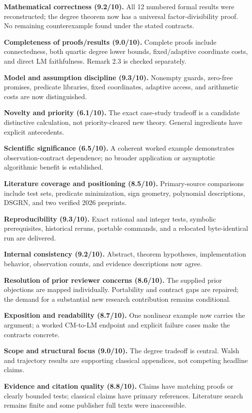 \documentclass[
  11pt,
]{article}
\begin{document}
\textbf{Mathematical correctness (9.2/10).} All 12 numbered formal
results were reconstructed; the degree theorem now has a universal
factor-divisibility proof. No remaining counterexample found under the
stated contracts.

\textbf{Completeness of proofs/results (9.0/10).} Complete proofs
include connectedness, both quartic degree lower bounds, fixed/adaptive
coordinate costs, and direct LM faithfulness. Remark 2.3 is checked
separately.

\textbf{Model and assumption discipline (9.3/10).} Nonempty guards,
zero-free promises, predicate libraries, fixed coordinates, adaptive
access, and arithmetic costs are now distinguished.

\textbf{Novelty and priority (6.1/10).} The exact case-study tradeoff is
a candidate distinctive calculation, not priority-cleared new theory.
General ingredients have explicit antecedents.

\textbf{Scientific significance (6.5/10).} A coherent worked example
demonstrates observation-contract dependence; no broader application or
asymptotic algorithmic benefit is established.

\textbf{Literature coverage and positioning (8.5/10).} Primary-source
comparisons include test sets, predicate minimization, sign geometry,
polynomial descriptions, DSGRN, and two verified 2026 preprints.

\textbf{Reproducibility (9.3/10).} Exact rational and integer tests,
symbolic prerequisites, historical reruns, portable commands, and a
relocated byte-identical run are delivered.

\textbf{Internal consistency (9.2/10).} Abstract, theorem hypotheses,
implementation behavior, observation counts, and evidence descriptions
now agree.

\textbf{Resolution of prior reviewer concerns (8.6/10).} The supplied
prior objections are mapped individually. Portability and contract gaps
are repaired; the demand for a substantial new research contribution
remains conditional.

\textbf{Exposition and readability (8.7/10).} One nonlinear example now
carries the argument; a worked CM-to-LM endpoint and explicit failure
cases make the contracts concrete.

\textbf{Scope and structural focus (9.0/10).} The degree tradeoff is
central. Walsh and trajectory results are supporting classical
appendices, not competing headline claims.

\textbf{Evidence and citation quality (8.8/10).} Claims have matching
proofs or clearly bounded tests; classical claims have primary
references. Literature search remains finite and some publisher full
texts were inaccessible.
\end{document}
